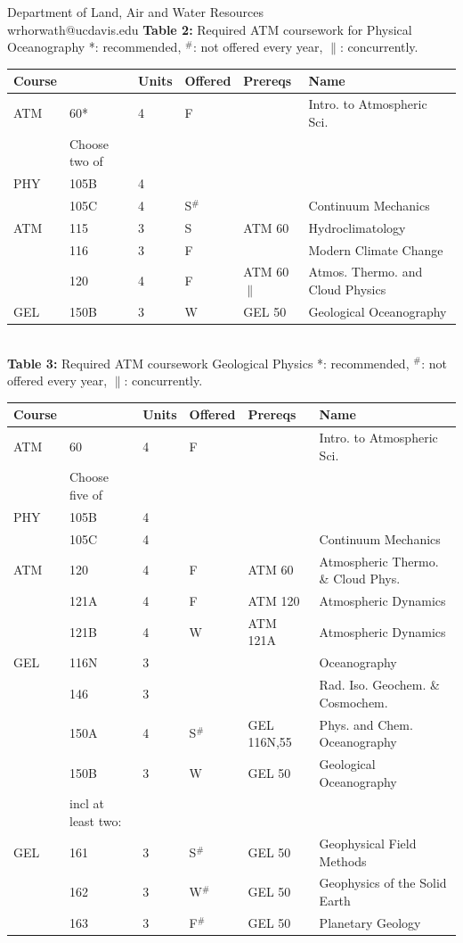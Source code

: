 \documentclass[letterpaper,12pt]{letter}
\begin{document}
\begin{letter}{Department of Land, Air and Water Resources \\ wrhorwath@ucdavis.edu}
{\bf Table 2:}  Required ATM coursework for Physical Oceanography
\vskip 0.25cm
\noindent
*: recommended, $^\#$: not offered every year, $\parallel$: concurrently.\\
\begin{tabular}{|llllll|}
\hline
Course & & Units & Offered & Prereqs & Name \\
\hline
ATM  & 60*    & 4 & F   & & Intro. to Atmospheric Sci. \\
\hline
\hline
    & Choose two of & & & & \\
\hline
PHY  & 105B  & 4 & & & \\
     & 105C  & 4 & S$^\#$ & & Continuum Mechanics \\
ATM  & 115   & 3 & S   & ATM 60 & Hydroclimatology \\
     & 116   & 3 & F   & & Modern Climate Change \\
     & 120   & 4 & F   & ATM 60$\parallel$ & Atmos. Thermo. and Cloud Physics \\
GEL  & 150B  & 3 & W & GEL 50 & Geological Oceanography\\
\hline
\end{tabular}\\

\newpage
{\bf Table 3:}  Required ATM coursework Geological Physics
\vskip 0.25cm
\noindent
*: recommended, $^\#$: not offered every year, $\parallel$: concurrently.\\
\begin{tabular}{|llllll|}
\hline
Course & & Units & Offered & Prereqs & Name \\
\hline
ATM & 60     & 4 & F   & & Intro. to Atmospheric Sci. \\
\hline
\hline
    & Choose five of & & & & \\
\hline
PHY  & 105B   & 4 & &  & \\
     & 105C   & 4 & &  & Continuum Mechanics\\
ATM  & 120    & 4 & F  & ATM 60    & Atmospheric Thermo. \& Cloud Phys. \\
     & 121A   & 4 & F  & ATM 120   & Atmospheric Dynamics \\
     & 121B   & 4 & W  & ATM 121A  & Atmospheric Dynamics \\
GEL  & 116N   & 3 &    & & Oceanography\\
     & 146    & 3 &    & & Rad. Iso. Geochem. \& Cosmochem. \\
     & 150A   & 4 & S$^\#$ & GEL 116N,55 & Phys. and Chem. Oceanography\\
     & 150B   & 3 & W  & GEL 50      & Geological Oceanography\\
\hline
     & incl at least two:  & & & & \\
\hline
GEL  & 161    & 3 & S$^\#$ & GEL 50 & Geophysical Field Methods \\
     & 162    & 3 & W$^\#$ & GEL 50 & Geophysics of the Solid Earth \\
     & 163    & 3 & F$^\#$ & GEL 50 & Planetary Geology \\
\hline
\end{tabular}\\


\end{letter}
\end{document}
